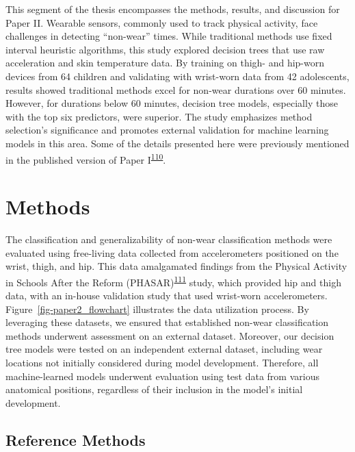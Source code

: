 \documentclass[
  9pt,
]{scrbook}
\begin{document}
This segment of the thesis encompasses the methods, results, and
discussion for Paper II. Wearable sensors, commonly used to track
physical activity, face challenges in detecting ``non-wear'' times.
While traditional methods use fixed interval heuristic algorithms, this
study explored decision trees that use raw acceleration and skin
temperature data. By training on thigh- and hip-worn devices from 64
children and validating with wrist-worn data from 42 adolescents,
results showed traditional methods excel for non-wear durations over 60
minutes. However, for durations below 60 minutes, decision tree models,
especially those with the top six predictors, were superior. The study
emphasizes method selection's significance and promotes external
validation for machine learning models in this area. Some of the details
presented here were previously mentioned in the published version of
Paper
I\textsuperscript{\protect\hyperlink{ref-skovgaard_generalizability_2023}{110}}.

\hypertarget{methods-1}{%
\section{Methods}\label{methods-1}}

The classification and generalizability of non-wear classification
methods were evaluated using free-living data collected from
accelerometers positioned on the wrist, thigh, and hip. This data
amalgamated findings from the Physical Activity in Schools After the
Reform
(PHASAR)\textsuperscript{\protect\hyperlink{ref-pedersen_protocol_2018}{111}}
study, which provided hip and thigh data, with an in-house validation
study that used wrist-worn accelerometers.
Figure~\ref{fig-paper2_flowchart} illustrates the data utilization
process. By leveraging these datasets, we ensured that established
non-wear classification methods underwent assessment on an external
dataset. Moreover, our decision tree models were tested on an
independent external dataset, including wear locations not initially
considered during model development. Therefore, all machine-learned
models underwent evaluation using test data from various anatomical
positions, regardless of their inclusion in the model's initial
development.

\hypertarget{reference-methods}{%
\subsection{Reference Methods}\label{reference-methods}}
\end{document}

